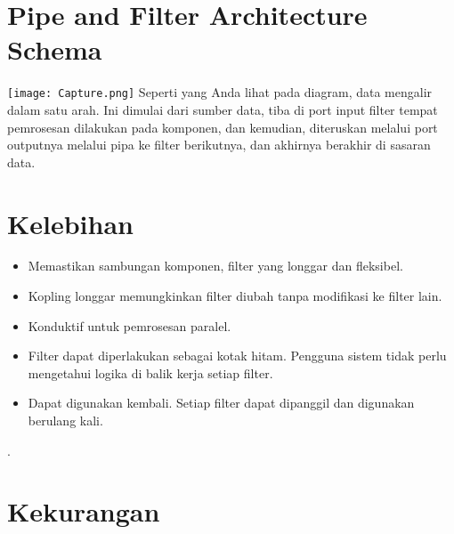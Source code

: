	
	\section{Pipe and Filter Architecture Schema
	}
	\texttt{[image: Capture.png]}
	Seperti yang Anda lihat pada diagram, data mengalir dalam satu arah. Ini dimulai dari sumber data, tiba di port input filter tempat pemrosesan dilakukan pada komponen, dan kemudian, diteruskan melalui port outputnya melalui pipa ke filter berikutnya, dan akhirnya berakhir di sasaran data.

	\section{Kelebihan}
	
	\begin{itemize}
		\item Memastikan sambungan komponen, filter yang longgar dan fleksibel.
		\item Kopling longgar memungkinkan filter diubah tanpa modifikasi ke filter lain.
		\item Konduktif untuk pemrosesan paralel.
		\item Filter dapat diperlakukan sebagai kotak hitam. Pengguna sistem tidak perlu mengetahui logika di balik kerja setiap filter.
		\item Dapat digunakan kembali. Setiap filter dapat dipanggil dan digunakan berulang kali.
	\end{itemize}
.
	
	
	\section{Kekurangan}
	
